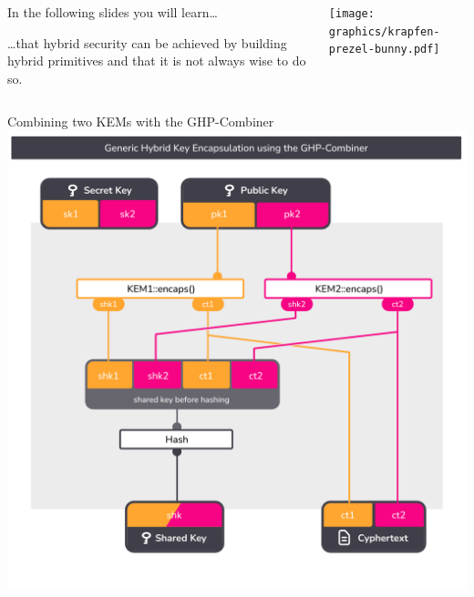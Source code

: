 \begin{frame}[light,s]{}
  \vspace{1cm}
  \large
  \vollkorn

  \begin{columns}[c]
    \begin{column}{.30\linewidth}


      In the following slides you will learn…
      \par\vspace{1.5em}
      …that hybrid security can be achieved by building hybrid primitives and that it is not always wise to do so.
    \end{column}

    \begin{column}{.40\linewidth}
      \texttt{[image: graphics/krapfen-prezel-bunny.pdf]}
    \end{column}
  \end{columns}
\end{frame}

\begin{frame}{Combining two KEMs with the GHP-Combiner}
  \centering
  \includegraphics[height=.92\textheight,page=1,clip=true,trim={0.5cm 1cm 0.7cm 1.5cm}]{graphics/rosenpass-encapsulation-combiner.pdf}
\end{frame}

